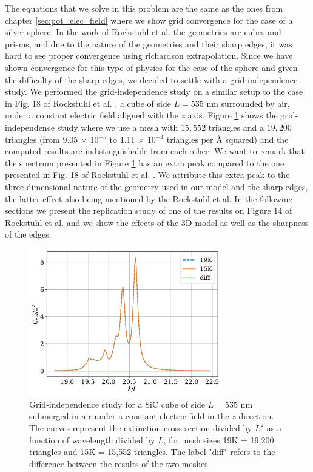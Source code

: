The equations that we solve in this problem are the same as the ones from chapter \ref{sec:pot_elec_field} where we show grid convergence for the case of 
a silver sphere. In the work of Rockstuhl et al. \cite{rockstuhl2005} the geometries are cubes and prisms, and due to the nature of the geometries 
and their sharp edges, it was hard to see proper convergence using richardson extrapolation. Since we have shown convergence for this type of physics
for the case of the sphere and given the difficulty of the sharp edges, we decided to settle with a grid-independence study. We performed the grid-independence study
on a similar setup to the case in Fig. 18 of Rockstuhl et al. \cite{rockstuhl2005}, a cube of side $L=535$ nm surrounded by air, under a constant electric field 
aligned with the $z$ axis. Figure \ref{fig:cube535} shows the grid-independence study where we use a mesh with $15,552$ triangles and a $19,200$ triangles 
(from 9.05 $\times$ 10$^{-5}$ to 1.11 $\times$ 10$^{-4}$ triangles per $\text{\AA}$ squared) and the computed results are indistinguishable from each other.
We want to remark that the spectrum presented in Figure \ref{fig:cube535} has an extra peak compared to the one presented in Fig. 18 of Rockstuhl
et al. \cite{rockstuhl2005}. We attribute this extra peak to the three-dimensional nature of the geometry used in our model and the sharp edges, the
latter effect also being mentioned by the Rockstuhl et al. In the following sections we present the replication study of one of the results on 
Figure 14 of Rockstuhl et al. and we show the effects of the 3D model as well as the sharpness of the edges. 

\begin{figure}
    \centering
    \includegraphics[width=0.75\textwidth]{cubeL535nm_15Kvs19K.pdf} 
    \caption{Grid-independence study for a SiC cube of side $L=535$ nm submerged in air under a constant 
    electric field in the $z$-direction. The curves represent the extinction cross-section divided by $L^2$ 
    as a function of wavelength divided by $L$, for mesh sizes 19K = 19,200 triangles and 15K = 15,552 triangles. 
    The label "diff" refers to the difference between the results of the two meshes.}
    \label{fig:cube535}
 \end{figure}

